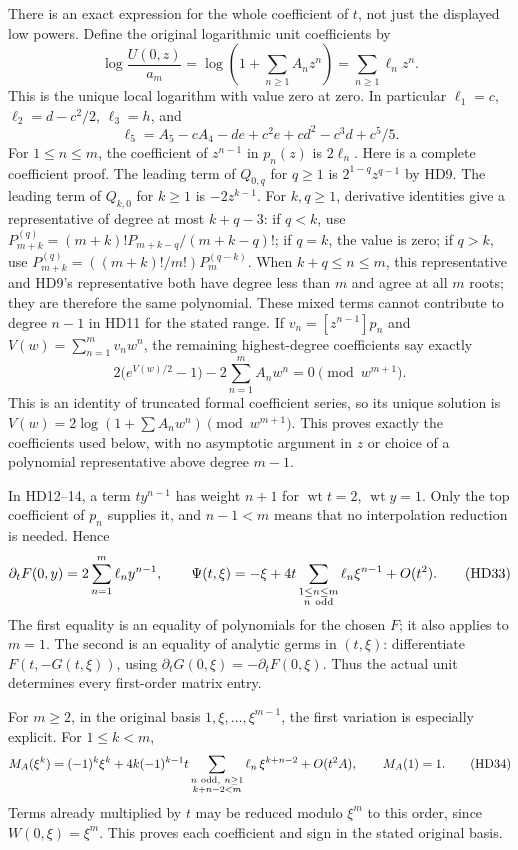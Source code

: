 \documentclass[11pt,a4paper]{article}
\theoremstyle{definition}\newtheorem{definition}[theorem]{Definition}
\begin{document}
There is an exact expression for the whole coefficient of $t$,
not just the displayed low powers. Define the original logarithmic
unit coefficients by
\[
 \log\frac{U(0,z)}{a_m}
       =\log\left(1+\sum_{n\ge1}A_nz^n\right)
       =\sum_{n\ge1}\ell_nz^n .
 \tag{HD30}\label{hd:logunit}
\]
This is the unique local logarithm with value zero at zero.
In particular $\ell_1=c$, $\ell_2=d-c^2/2$, $\ell_3=h$, and
\[
 \ell_5=A_5-cA_4-d e+c^2e+cd^2-c^3d+c^5/5.
 \tag{HD31}
\]
For $1\le n\le m$, the coefficient of $z^{n-1}$ in $p_n(z)$
is $2\ell_n$.
Here is a complete coefficient proof. The leading term of
$Q_{0,q}$ for $q\ge1$ is $2^{1-q}z^{q-1}$ by HD9.
The leading term of $Q_{k,0}$ for $k\ge1$ is $-2z^{k-1}$.
For $k,q\ge1$, derivative identities give a representative of degree
at most $k+q-3$: if $q<k$, use
$P_{m+k}^{(q)}=(m+k)!P_{m+k-q}/(m+k-q)!$;
if $q=k$, the value is zero; if $q>k$, use
$P_{m+k}^{(q)}=((m+k)!/m!)P_m^{(q-k)}$.
When $k+q\le n\le m$, this representative and HD9's representative
both have degree less than $m$ and agree at all $m$ roots;
they are therefore the same polynomial. These mixed terms cannot
contribute to degree $n-1$ in HD11 for the stated range.
If $v_n=[z^{n-1}]p_n$ and $V(w)=\sum_{n=1}^m v_nw^n$,
the remaining highest-degree coefficients say exactly
\[
 2\bigl(e^{V(w)/2}-1\bigr)-2\sum_{n=1}^m A_nw^n
          =0\pmod{w^{m+1}}.
 \tag{HD32}
\]
This is an identity of truncated formal coefficient series, so its
unique solution is
$V(w)=2\log(1+\sum A_nw^n)\pmod{w^{m+1}}$.
This proves exactly the coefficients used below, with no
asymptotic argument in $z$ or choice of a polynomial representative
above degree $m-1$.

In HD12--14, a term $t y^{n-1}$ has weight $n+1$ for
$\operatorname{wt}t=2$, $\operatorname{wt}y=1$.
Only the top coefficient of $p_n$ supplies it, and $n-1<m$
means that no interpolation reduction is needed. Hence
\[
 \partial_t F(0,y)=2\sum_{n=1}^m\ell_n y^{n-1},\qquad
 \Psi(t,\xi)=-\xi+
       4t\sum_{\substack{1\le n\le m\\ n\ {\rm odd}}}
                         \ell_n\xi^{n-1}+O(t^2).
 \tag{HD33}\label{hd:firstvariation}
\]
The first equality is an equality of polynomials for the chosen
$F$; it also applies to $m=1$.
The second is an equality of analytic germs in $(t,\xi)$:
differentiate $F(t,-G(t,\xi))$, using
$\partial_tG(0,\xi)=-\partial_tF(0,\xi)$.
Thus the actual unit determines every first-order matrix entry.

For $m\ge2$, in the original basis $1,\xi,\ldots,\xi^{m-1}$,
the first variation is especially explicit. For $1\le k<m$,
\[
 M_A(\xi^k)=(-1)^k\xi^k+
 4k(-1)^{k-1}t
   \sum_{\substack{n\ {\rm odd},\ n\ge1\\k+n-2<m}}
                 \ell_n\,\xi^{k+n-2}+O(t^2A),
 \qquad M_A(1)=1 .
 \tag{HD34}\label{hd:matrixvariation}
\]
Terms already multiplied by $t$ may be reduced modulo $\xi^m$
to this order, since $W(0,\xi)=\xi^m$.
This proves each coefficient and sign in the stated original basis.
\end{document}
